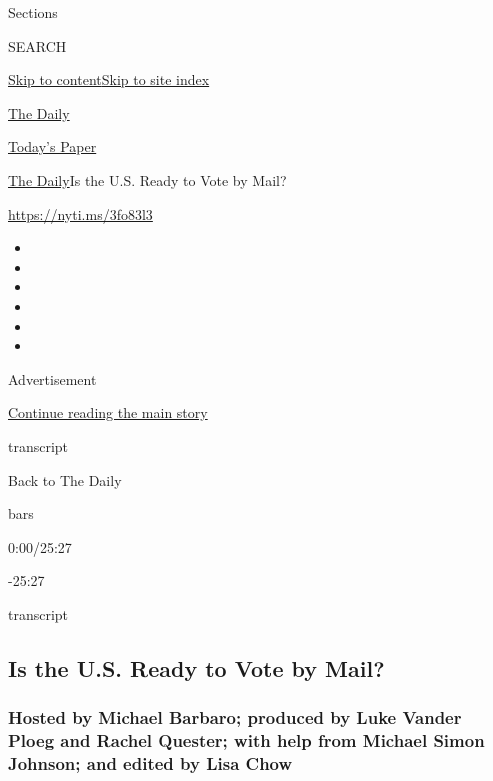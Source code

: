 Sections

SEARCH

\protect\hyperlink{site-content}{Skip to
content}\protect\hyperlink{site-index}{Skip to site index}

\href{https://www.nytimes3xbfgragh.onion/podcasts/the-daily}{The Daily}

\href{https://myaccount.nytimes3xbfgragh.onion/auth/login?response_type=cookie\&client_id=vi}{}

\href{https://www.nytimes3xbfgragh.onion/section/todayspaper}{Today's
Paper}

\href{/podcasts/the-daily}{The Daily}\textbar{}Is the U.S. Ready to Vote
by Mail?

\url{https://nyti.ms/3fo83l3}

\begin{itemize}
\item
\item
\item
\item
\item
\item
\end{itemize}

Advertisement

\protect\hyperlink{after-top}{Continue reading the main story}

transcript

Back to The Daily

bars

0:00/25:27

-25:27

transcript

\hypertarget{is-the-us-ready-to-vote-by-mail}{%
\subsection{Is the U.S. Ready to Vote by
Mail?}\label{is-the-us-ready-to-vote-by-mail}}

\hypertarget{hosted-by-michael-barbaro-produced-by-luke-vander-ploeg-and-rachel-quester-with-help-from-michael-simon-johnson-and-edited-by-lisa-chow}{%
\subsubsection{Hosted by Michael Barbaro; produced by Luke Vander Ploeg
and Rachel Quester; with help from Michael Simon Johnson; and edited by
Lisa
Chow}\label{hosted-by-michael-barbaro-produced-by-luke-vander-ploeg-and-rachel-quester-with-help-from-michael-simon-johnson-and-edited-by-lisa-chow}}

